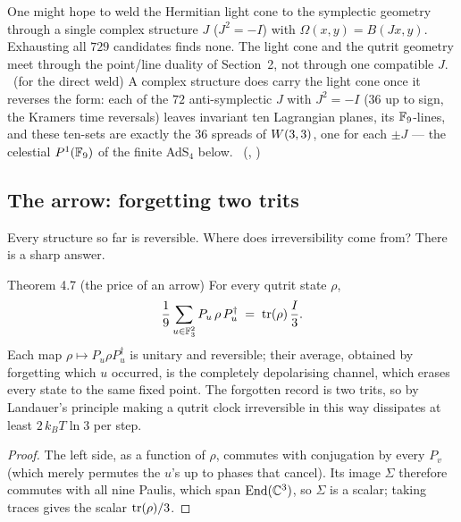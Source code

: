 \begin{boundary}
One might hope to weld the Hermitian light cone to the symplectic geometry through a
single complex structure $J$ ($J^2=-I$) with $\Omega(x,y)=B(Jx,y)$. Exhausting all
$729$ candidates finds none. The light cone and the qutrit geometry meet through the
point/line duality of Section~2, not through one compatible $J$. \tierX\ (for the direct weld) A complex structure does carry the light cone once it reverses the form: each of the $72$ anti-symplectic $J$ with $J^2=-I$ ($36$ up to sign, the Kramers time reversals) leaves invariant ten Lagrangian planes, its $\mathbb{F}_9$-lines, and these ten-sets are exactly the $36$ spreads of $W(3,3)$, one for each $\pm J$ --- the celestial $P^1(\mathbb{F}_9)$ of the finite AdS$_4$ below. \tierC\ (, )
\end{boundary}

\subsection{The arrow: forgetting two trits}

Every structure so far is reversible. Where does irreversibility come from? There is a
sharp answer.

\begin{result}{Theorem 4.7 (the price of an arrow) \hfill \tierT}
For every qutrit state $\rho$,
\[
\frac19\sum_{u\in\mathbb{F}_3^2} P_u\,\rho\,P_u^\dagger \;=\; \operatorname{tr}(\rho)\,\frac{I}{3}.
\]
Each map $\rho\mapsto P_u\rho P_u^\dagger$ is unitary and reversible; their average,
obtained by forgetting which $u$ occurred, is the completely depolarising channel, which
erases every state to the same fixed point. The forgotten record is two trits, so by
Landauer's principle \cite{Landauer} making a qutrit clock irreversible in this way dissipates at least
$2\,k_BT\ln3$ per step.
\end{result}

\begin{proof}
The left side, as a function of $\rho$, commutes with conjugation by every $P_v$ (which
merely permutes the $u$'s up to phases that cancel). Its image $\Sigma$ therefore
commutes with all nine Paulis, which span $\mathrm{End}(\mathbb{C}^3)$, so $\Sigma$ is a scalar; taking
traces gives the scalar $\operatorname{tr}(\rho)/3$.
\end{proof}

